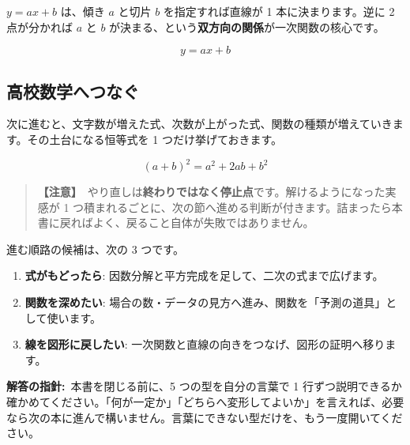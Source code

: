 \documentclass{article}
\begin{document}
\(y = ax + b\) は、傾き \(a\) と切片 \(b\) を指定すれば直線が 1 本に決まります。逆に 2 点が分かれば \(a\) と \(b\) が決まる、という\textbf{双方向の関係}が一次関数の核心です。

\[ y = ax + b \]

\subsection{高校数学へつなぐ}

次に進むと、文字数が増えた式、次数が上がった式、関数の種類が増えていきます。その土台になる恒等式を 1 つだけ挙げておきます。

\[ (a + b)^2 = a^2 + 2ab + b^2 \]

\begin{quote}
\textbf{【注意】}\ やり直しは\textbf{終わりではなく停止点}です。解けるようになった実感が 1 つ積まれるごとに、次の節へ進める判断が付きます。詰まったら本書に戻ればよく、戻ること自体が失敗ではありません。
\end{quote}

進む順路の候補は、次の 3 つです。

\begin{enumerate}
\item \textbf{式がもどったら}: 因数分解と平方完成を足して、二次の式まで広げます。
\item \textbf{関数を深めたい}: 場合の数・データの見方へ進み、関数を「予測の道具」として使います。
\item \textbf{線を図形に戻したい}: 一次関数と直線の向きをつなげ、図形の証明へ移ります。
\end{enumerate}

\textbf{解答の指針:}\ 本書を閉じる前に、5 つの型を自分の言葉で 1 行ずつ説明できるか確かめてください。「何が一定か」「どちらへ変形してよいか」を言えれば、必要なら次の本に進んで構いません。言葉にできない型だけを、もう一度開いてください。
\end{document}
